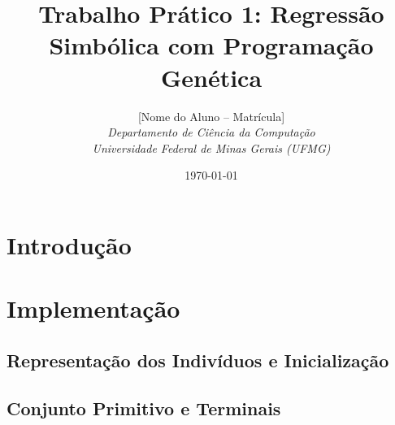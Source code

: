\documentclass[11pt,a4paper]{article}
\title{\textbf{Trabalho Prático 1: Regressão Simbólica com Programação Genética}}
\author{[Nome do Aluno -- Matrícula]\\
\textit{Departamento de Ciência da Computação}\\
\textit{Universidade Federal de Minas Gerais (UFMG)}}
\date{\today}
\begin{document}
\maketitle

\begin{abstract}
\end{abstract}

\section{Introdução}

\section{Implementação}

\subsection{Representação dos Indivíduos e Inicialização}

\subsection{Conjunto Primitivo e Terminais}
\end{document}
